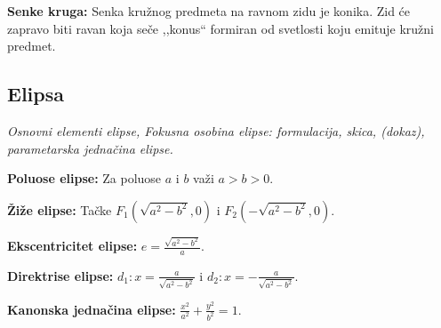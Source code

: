 \documentclass[12pt]{article}
\begin{document}
\textbf{Senke kruga:} Senka kružnog predmeta na ravnom zidu je konika. Zid
će zapravo biti ravan koja seče ,,konus`` formiran od svetlosti koju emituje
kružni predmet.

\subsection{Elipsa}
\textit{Osnovni elementi elipse, Fokusna osobina elipse: formulacija, skica,
    (dokaz), parametarska jednačina elipse.}
\par
\vspace*{1cm}

\textbf{Poluose elipse:} Za poluose $a$ i $b$ važi $a>b>0$.
\par

\textbf{Žiže elipse:} Tačke $F_1(\sqrt{a^2-b^2},0)$ i $F_2(-\sqrt{a^2-b^2},0)$.
\par

\textbf{Ekscentricitet elipse:} $e=\frac{\sqrt{a^2-b^2}}{a}$.
\par

\textbf{Direktrise elipse:} $d_1: x=\frac{a}{\sqrt{a^2-b^2}}$ i
$d_2: x=-\frac{a}{\sqrt{a^2-b^2}}$.
\par

\textbf{Kanonska jednačina elipse:} $\frac{x^2}{a^2}+\frac{y^2}{b^2}=1$.
\par
\end{document}
